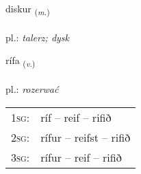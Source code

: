 \documentclass[frontgrid, backgrid]{flacards}\usepackage[]{graphicx}\usepackage[]{xcolor}
\begin{document}
{diskur \small{\textsubscript{(\textit{m.})}} \\[1ex] %
\textphonetic{[tɪskʏr]} \\
pl.: \emph{talerz; dysk} \\  [2ex]
\renewcommand*{\arraystretch}{0.8}
}

\renewcommand{\flhead}{\vskip5pt \fboxsep=0pt {\small\bfseries\footnotesize Sagnorð | Verb}}
\renewcommand{\fcfoot}{\vskip5pt \fboxsep=0pt \hspace{2pt}{\small\bfseries\footnotesize 2K}}

\renewcommand{\blhead}{\vskip5pt {\small\bfseries\footnotesize Sagnorð | Verb }}
\renewcommand{\bcfoot}{\vskip5pt \hspace{2pt}{\small\bfseries\footnotesize 2K}}


{rífa \small{\textsubscript{(\textit{v.})}} \\[1ex] %
\textphonetic{[riːva]} \\
pl.: \emph{rozerwać} \\  [2ex]
\renewcommand*{\arraystretch}{0.8}
\begin{tabular}{p{1cm}l}
\textsc{1sg}: & ríf -- reif -- rifið \\ 
\textsc{2sg}: & rífur -- reifst -- rifið \\ 
\textsc{3sg}: & rífur -- reif -- rifið \\ 
\end{tabular}
}

\renewcommand{\flhead}{\vskip5pt \fboxsep=0pt {\small\bfseries\footnotesize Lýsingarorð | Adjective}}
\renewcommand{\fcfoot}{\vskip5pt \fboxsep=0pt \hspace{2pt}{\small\bfseries\footnotesize 2K}}

\renewcommand{\blhead}{\vskip5pt {\small\bfseries\footnotesize Lýsingarorð | Adjective }}
\renewcommand{\bcfoot}{\vskip5pt \hspace{2pt}{\small\bfseries\footnotesize 2K}}
\end{document}
